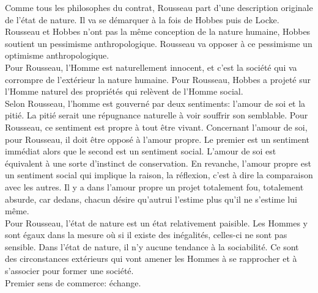 \documentclass[10pt, a4paper, openany]{book}
\begin{document}
Comme tous les philosophes du contrat, Rousseau part d'une description originale de l'état de nature. Il va se démarquer à la fois de Hobbes puis de Locke. Rousseau et Hobbes n'ont pas la même conception de la nature humaine, Hobbes soutient un pessimisme anthropologique. Rousseau va opposer à ce pessimisme un optimisme anthropologique. \\
Pour Rousseau, l'Homme est naturellement innocent, et c'est la société qui va corrompre de l'extérieur la nature humaine. Pour Rousseau, Hobbes a projeté sur l'Homme naturel des propriétés qui relèvent de l'Homme social. \\
Selon Rousseau, l'homme est gouverné par deux sentiments: l'amour de soi et la pitié. La pitié serait une répugnance naturelle à voir souffrir son semblable. Pour Rousseau, ce sentiment est propre à tout être vivant. Concernant l'amour de soi, pour Rousseau, il doit être opposé à l'amour propre. Le premier est un sentiment immédiat alors que  le second est un sentiment social. L'amour de soi est équivalent à une sorte d'instinct de conservation. En revanche, l'amour propre est un sentiment social qui implique la raison, la réflexion, c'est à dire la comparaison avec les autres. Il y a dans l'amour propre un projet totalement fou, totalement absurde, car dedans, chacun désire qu'autrui l'estime plus qu'il ne s'estime lui même.\\
Pour Rousseau, l'état de nature est un état relativement paisible. Les Hommes y sont égaux dans la mesure où si il existe des inégalités, celles-ci ne sont pas sensible. Dans l'état de nature, il n'y aucune tendance à la sociabilité. Ce sont des circonstances extérieurs qui vont amener les Hommes à se rapprocher et à s'associer pour former une société. \\
Premier sens de  commerce: échange. 
\end{document}
